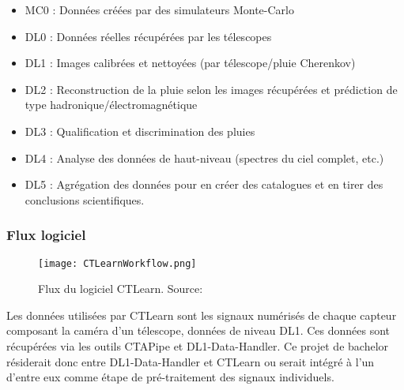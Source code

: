 \begin{itemize}
	\item MC0 : Données créées par des simulateurs Monte-Carlo
	\item DL0 : Données réelles récupérées par les télescopes
	\item DL1 : Images calibrées et nettoyées (par télescope/pluie Cherenkov)
	\item DL2 : Reconstruction de la pluie selon les images récupérées et prédiction de type hadronique/électromagnétique
	\item DL3 : Qualification et discrimination des pluies
	\item DL4 : Analyse des données de haut-niveau (spectres du ciel complet, etc.)
	\item DL5 : Agrégation des données pour en créer des catalogues et en tirer des conclusions scientifiques.
\end{itemize}

\subsubsection{Flux logiciel}

\begin{figure}[tbph!]
	\centering
	\texttt{[image: CTLearnWorkflow.png]}
	\caption[Flux du logiciel CTLearn]{Flux du logiciel CTLearn. Source: \cite{CTLearnWorkflow}}
\end{figure}

Les données utilisées par CTLearn sont les signaux numérisés de chaque capteur composant la caméra d'un télescope, données de niveau DL1.
Ces données sont récupérées via les outils CTAPipe et DL1-Data-Handler. 
Ce projet de bachelor résiderait donc entre DL1-Data-Handler et CTLearn ou serait intégré à l'un d'entre eux comme étape de pré-traitement des signaux individuels.